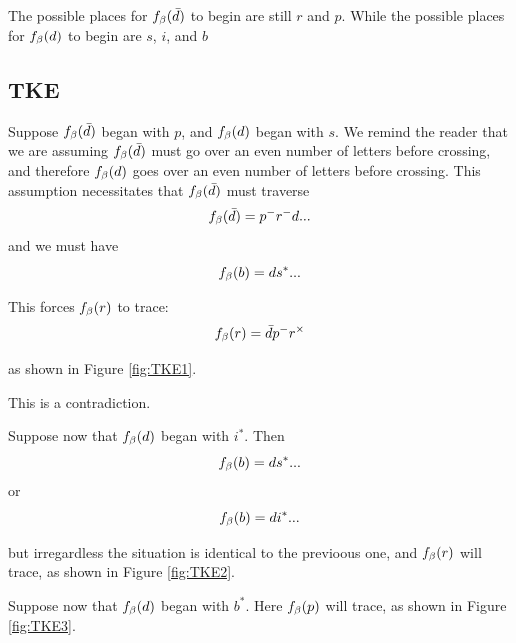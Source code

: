 The possible places for $f_\beta(\bar{d})$ to begin are still $r$ and $p$. While the possible places for $f_\beta(d)$ to begin are $s$, $i$, and $b$

\subsection{TKE}\label{TKE}
Suppose $f_\beta(\bar{d})$ began with $p$, and $f_\beta(d)$ began with $s$.
We remind the reader that we are assuming $f_\beta(\bar{d})$ must go over an even number of letters before crossing, and therefore $f_\beta(d)$ goes over an even number of letters before crossing. This assumption necessitates that $f_\beta(\bar{d})$ must traverse 
\[
f_\beta(\bar{d}) = p^- r^- d...
\]
and we must have
\[
f_\beta(b) = d s^*...
\]

This forces $f_\beta(r)$ to trace:
\[
f_\beta(r) = \bar{d} p^- r^\times
\]

as shown in Figure \ref{fig:TKE1}.

This is a contradiction.

Suppose now that $f_\beta(d)$ began with $i^*$. Then
\[
f_\beta(b) = d s^*...
\]
or
\[
f_\beta(b) = d i^*...
\]

but irregardless the situation is identical to the previoous one, and $f_\beta(r)$ will trace, as shown in Figure \ref{fig:TKE2}.

Suppose now that $f_\beta(d)$ began with $b^*$. Here $f_\beta(p)$ will trace, as shown in Figure \ref{fig:TKE3}.








